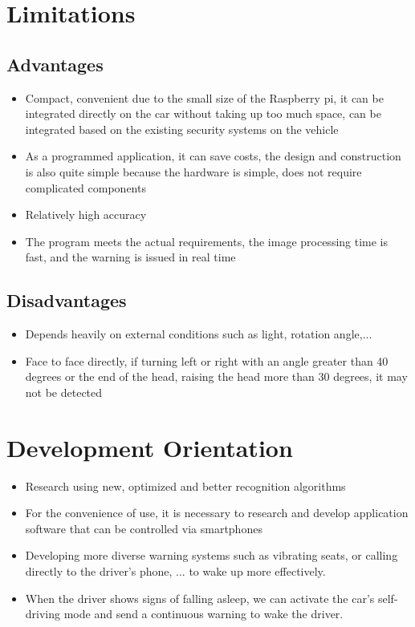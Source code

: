 \section{Limitations}
    \subsection{Advantages}
        \begin{itemize}
            \item Compact, convenient due to the small size of the Raspberry pi, it can be integrated directly on the car without 
            taking up too much space, can be integrated based on the existing security systems on the vehicle
            \item As a programmed application, it can save costs, the design and construction is also quite simple because the 
            hardware is simple, does not require complicated components
            \item Relatively high accuracy
            \item The program meets the actual requirements, the image processing time is fast, and the warning is issued in real time
        \end{itemize}
    \subsection{Disadvantages}
        \begin{itemize}
            \item Depends heavily on external conditions such as light, rotation angle,... 
            \item Face to face directly, if turning left or right with an angle greater than 40 degrees or the end of the head, 
            raising the head more than 30 degrees, it may not be detected
        \end{itemize}

\section{Development Orientation}
    \begin{itemize}
        \item Research using new, optimized and better recognition algorithms
        \item For the convenience of use, it is necessary to research and develop application software that can be controlled via smartphones
        \item Developing more diverse warning systems such as vibrating seats, or calling directly to the driver's phone, ... to wake up more effectively.
        \item When the driver shows signs of falling asleep, we can activate the car's self-driving mode and send a continuous warning to wake the driver.
    \end{itemize}